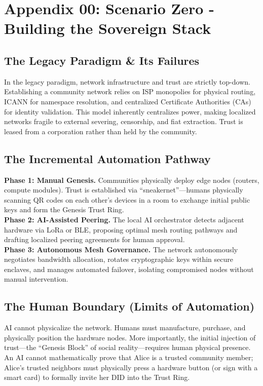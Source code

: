 \chapter{Appendix 00: Scenario Zero - Building the Sovereign Stack}

\section{The Legacy Paradigm \& Its Failures}
In the legacy paradigm, network infrastructure and trust are strictly top-down. Establishing a community network relies on ISP monopolies for physical routing, ICANN for namespace resolution, and centralized Certificate Authorities (CAs) for identity validation. This model inherently centralizes power, making localized networks fragile to external severing, censorship, and fiat extraction. Trust is leased from a corporation rather than held by the community.

\section{The Incremental Automation Pathway}
\textbf{Phase 1: Manual Genesis.} Communities physically deploy edge nodes (routers, compute modules). Trust is established via ``sneakernet''---humans physically scanning QR codes on each other's devices in a room to exchange initial public keys and form the Genesis Trust Ring. \\
\textbf{Phase 2: AI-Assisted Peering.} The local AI orchestrator detects adjacent hardware via LoRa or BLE, proposing optimal mesh routing pathways and drafting localized peering agreements for human approval. \\
\textbf{Phase 3: Autonomous Mesh Governance.} The network autonomously negotiates bandwidth allocation, rotates cryptographic keys within secure enclaves, and manages automated failover, isolating compromised nodes without manual intervention.

\section{The Human Boundary (Limits of Automation)}
AI cannot physicalize the network. Humans must manufacture, purchase, and physically position the hardware nodes. More importantly, the initial injection of trust---the ``Genesis Block'' of social reality---requires human physical presence. An AI cannot mathematically prove that Alice is a trusted community member; Alice's trusted neighbors must physically press a hardware button (or sign with a smart card) to formally invite her DID into the Trust Ring.

